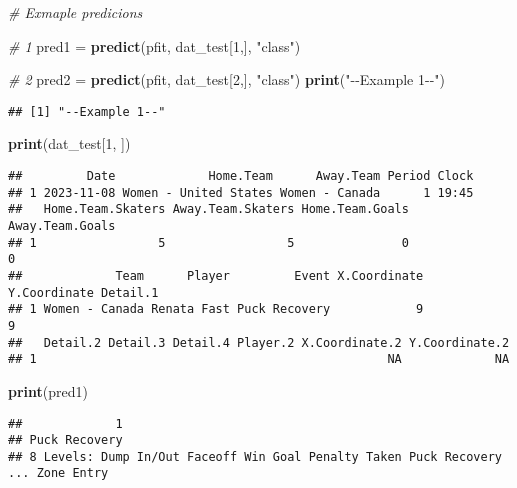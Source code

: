 \documentclass[
  a3paper,
]{article}
\newenvironment{Shaded}{\begin{snugshade}}{\end{snugshade}}
\newcommand{\CommentTok}[1]{\textcolor[rgb]{0.56,0.35,0.01}{\textit{#1}}}
\newcommand{\DecValTok}[1]{\textcolor[rgb]{0.00,0.00,0.81}{#1}}
\newcommand{\FunctionTok}[1]{\textcolor[rgb]{0.13,0.29,0.53}{\textbf{#1}}}
\newcommand{\NormalTok}[1]{#1}
\newcommand{\OtherTok}[1]{\textcolor[rgb]{0.56,0.35,0.01}{#1}}
\newcommand{\StringTok}[1]{\textcolor[rgb]{0.31,0.60,0.02}{#1}}
\begin{document}
\begin{Shaded}
\begin{Highlighting}[]
\CommentTok{\# Exmaple predicions}

\CommentTok{\# 1}
\NormalTok{pred1 }\OtherTok{=} \FunctionTok{predict}\NormalTok{(pfit, dat\_test[}\DecValTok{1}\NormalTok{,], }\StringTok{"class"}\NormalTok{)}

\CommentTok{\# 2}
\NormalTok{pred2 }\OtherTok{=} \FunctionTok{predict}\NormalTok{(pfit, dat\_test[}\DecValTok{2}\NormalTok{,], }\StringTok{"class"}\NormalTok{)}
\FunctionTok{print}\NormalTok{(}\StringTok{"{-}{-}Example 1{-}{-}"}\NormalTok{)}
\end{Highlighting}
\end{Shaded}

\begin{verbatim}
## [1] "--Example 1--"
\end{verbatim}

\begin{Shaded}
\begin{Highlighting}[]
\FunctionTok{print}\NormalTok{(dat\_test[}\DecValTok{1}\NormalTok{, ])}
\end{Highlighting}
\end{Shaded}

\begin{verbatim}
##         Date             Home.Team      Away.Team Period Clock
## 1 2023-11-08 Women - United States Women - Canada      1 19:45
##   Home.Team.Skaters Away.Team.Skaters Home.Team.Goals Away.Team.Goals
## 1                 5                 5               0               0
##             Team      Player         Event X.Coordinate Y.Coordinate Detail.1
## 1 Women - Canada Renata Fast Puck Recovery            9            9         
##   Detail.2 Detail.3 Detail.4 Player.2 X.Coordinate.2 Y.Coordinate.2
## 1                                                 NA             NA
\end{verbatim}

\begin{Shaded}
\begin{Highlighting}[]
\FunctionTok{print}\NormalTok{(pred1)}
\end{Highlighting}
\end{Shaded}

\begin{verbatim}
##             1 
## Puck Recovery 
## 8 Levels: Dump In/Out Faceoff Win Goal Penalty Taken Puck Recovery ... Zone Entry
\end{verbatim}
\end{document}
